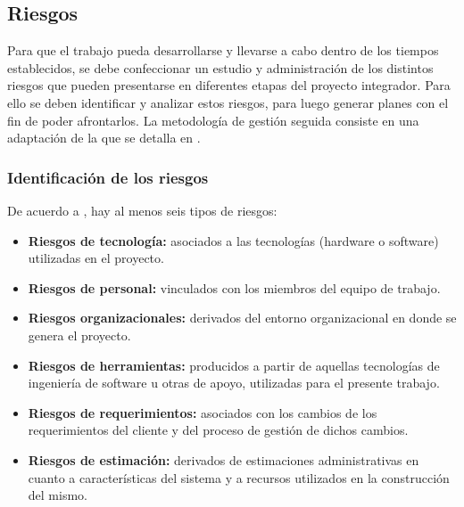 

\subsection{Riesgos}

Para que el trabajo pueda desarrollarse y llevarse a cabo dentro de los tiempos establecidos, se debe confeccionar un estudio y administración de los distintos riesgos que pueden presentarse en diferentes etapas del proyecto integrador. Para ello se deben identificar y  analizar estos riesgos, para luego generar planes con el fin de poder afrontarlos. La metodología de gestión seguida consiste en una adaptación de la que se detalla en \parencite{Ing_software}.

\subsubsection *{Identificación de los riesgos}

De acuerdo a \parencite{Ing_software}, hay al menos seis tipos de riesgos:

\begin{itemize}
\item {\textbf{Riesgos de tecnología:} asociados a las tecnologías (hardware o software) utilizadas en el proyecto.}
\item {\textbf{Riesgos de personal:} vinculados con los miembros del equipo de trabajo.}
\item {\textbf{Riesgos organizacionales:} derivados del entorno organizacional en donde se genera el proyecto.}
\item {\textbf{Riesgos de herramientas:} producidos a partir de aquellas
    tecnologías de ingeniería de software u otras de apoyo, utilizadas para el
    presente trabajo.}
\item {\textbf{Riesgos de requerimientos:} asociados con los cambios de los requerimientos del cliente y del proceso de gestión de dichos cambios.}
\item {\textbf{Riesgos de estimación:} derivados de estimaciones administrativas en cuanto a características del sistema y a recursos utilizados en la construcción del mismo.}
\end{itemize}


